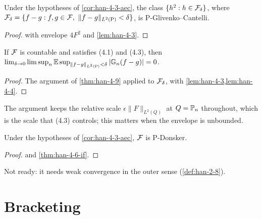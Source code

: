 \begin{lemma}
  \label{lem:han-4-4}
  Under the hypotheses of \cref{cor:han-4-3-aec}, the class $\{h^2:h\in\mathcal{F}_\delta\}$, where $\mathcal{F}_\delta=\{f-g:f,g\in\mathcal{F},\ \|f-g\|_{L^2(\mathrm P)}<\delta\}$, is $\mathrm P$-Glivenko--Cantelli.
\end{lemma}
\begin{proof}
   with envelope $4F^2$ and \cref{lem:han-4-3}.
\end{proof}

\begin{corollary}
  \label{cor:han-4-3-aec}
  If $\mathcal{F}$ is countable and satisfies (4.1) and (4.3), then
  $\lim_{\delta\to0}\limsup_n\mathbb{E}\sup_{\|f-g\|_{L^2(\mathrm P)}<\delta}|\mathbb{G}_n(f-g)|=0$.
\end{corollary}
\begin{proof}
  The argument of \cref{thm:han-4-9} applied to $\mathcal{F}_\delta$, with \cref{lem:han-4-3,lem:han-4-4}.
\end{proof}
\begin{remark}
  The argument keeps the relative scale $\epsilon\|F\|_{L^2(Q)}$ at $Q=\mathbb{P}_n$ throughout, which is the scale that (4.3) controls; this matters when the envelope is unbounded.
\end{remark}

\begin{corollary}
  \label{cor:han-4-3-donsker}
  \notready
  Under the hypotheses of \cref{cor:han-4-3-aec}, $\mathcal{F}$ is $\mathrm P$-Donsker.
\end{corollary}
\begin{proof}
   and \cref{thm:han-4-6-if}.
\end{proof}
\begin{remark}
  Not ready: it needs weak convergence in the outer sense (\cref{def:han-2-8}).
\end{remark}

\section{Bracketing}

